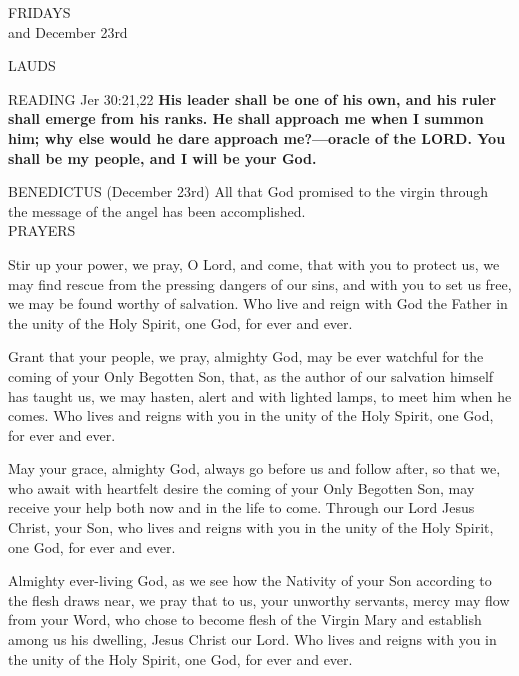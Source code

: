 \begin{center}\normalsize{\uppercase{Fridays}}\\
\footnotesize{and December 23rd}\end{center}
\begin{flushleft}\normalsize{\uppercase{Lauds\\}}\end{flushleft}
\noindent\small{\uppercase{Reading}} Jer 30:21,22 \textbf{ His leader shall be one of his own, and his ruler shall emerge from his ranks. He shall approach me when I summon him; why else would he dare approach me?—oracle of the LORD. You shall be my people, and I will be your God.\\}

\noindent\small{\uppercase{Benedictus}} (December 23rd)
All that God promised to the virgin through the message of the angel has been accomplished.\\

\noindent\small{\uppercase{Prayers}}\begin{description}[labelindent=\parindent, leftmargin=*]
\item [Week 1] Stir up your power, we pray, O Lord, and come, that with you to protect us, we may find rescue from the pressing dangers of our sins, and with you to set us free, we may be found worthy of salvation. Who live and reign with God the Father in the unity of the Holy Spirit, one God, for ever and ever.
\item [Week 2] Grant that your people, we pray, almighty God, may be ever watchful for the coming of your Only Begotten Son, that, as the author of our salvation himself has taught us, we may hasten, alert and with lighted lamps, to meet him when he comes. Who lives and reigns with you in the unity of the Holy Spirit, one God, for ever and ever.
\item [Week 3] May your grace, almighty God, always go before us and follow after, so that we, who await with heartfelt desire the coming of your Only Begotten Son, may receive your help both now and in the life to come. Through our Lord Jesus Christ, your Son, who lives and reigns with you in the unity of the Holy Spirit, one God, for ever and ever.
\item [December 23rd] Almighty ever-living God, as we see how the Nativity of your Son according to the flesh draws near, we pray that to us, your unworthy servants, mercy may flow from your Word, who chose to become flesh of the Virgin Mary and establish among us his dwelling, Jesus Christ our Lord. Who lives and reigns with you in the unity of the Holy Spirit, one God, for ever and ever.
\end{description}


